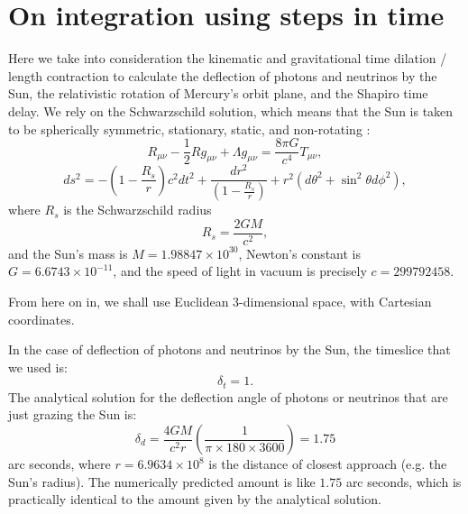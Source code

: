 \documentclass[12pt]{article}
\begin{document}
\section{On integration using steps in time}

Here we take into consideration the kinematic and gravitational time dilation / length contraction to calculate the deflection of photons and neutrinos by the Sun, the relativistic rotation of Mercury's orbit plane, and the Shapiro time delay.
We rely on the Schwarzschild solution, which means that the Sun is taken to be spherically symmetric, stationary, static, and non-rotating \cite{einstein, misner, schutz, mcmahon}:
\begin{equation}
\label{efe}
R_{\mu\nu} - \frac{1}{2} R g_{\mu\nu} + \Lambda g_{\mu\nu} = \frac{8\pi G}{c^4} T_{\mu\nu},
\end{equation}
\begin{equation}
\label{schwarzschild_line_element}
ds^2 = -\left( 1 - \frac{R_{s}}{r} \right) c^2 dt^2 + \frac{dr^2}{\left( 1 - \frac{R_{s}}{r} \right)} + r^2 (d\theta^2 + \sin^2 \theta d\phi^2),
\end{equation}
where $R_{s}$ is the Schwarzschild radius
\begin{equation}
\label{schwarzschild_radius}
R_{s} = \frac{2GM}{c^2},
\end{equation}
and the Sun's mass is $M = 1.98847 \times 10^{30}$, Newton's constant is $G = 6.6743 \times 10^{-11}$, and the speed of light in vacuum is precisely $c = 299792458$.

From here on in, we shall use Euclidean 3-dimensional space, with Cartesian coordinates.

In the case of deflection of photons and neutrinos by the Sun, the timeslice that we used is:
\begin{equation}
\label{dt_1}
\delta_{t} = 1.
\end{equation}
The analytical solution for the deflection angle of photons or neutrinos that are just grazing the Sun is:
\begin{equation}
\label{delta_d}
\delta_{d} = \frac{4GM}{c^2 r} \left( \frac{1}{\pi \times 180 \times 3600} \right) = 1.75
\end{equation}
arc seconds, where $r = 6.9634 \times 10^8$ is the distance of closest approach (e.g. the Sun's radius).
The numerically predicted amount is like $1.75$ arc seconds, which is practically identical to the amount given by the analytical solution.
\end{document}

